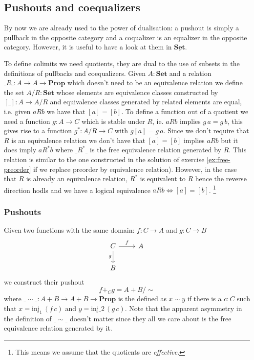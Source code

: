 \documentclass{article}
\newcommand{\Prop}{\mathbf{Prop}}
\newcommand{\Set}{\mathbf{Set}}
\newcommand{\cat}[1]{\underline{\mathbf{#1}}}
\newcommand{\inj}{\mathrm{inj}}
\begin{document}
\subsection{Pushouts and coequalizers}
\label{sec:push-coeq}

By now we are already used to the power of dualisation: a pushout is simply a pullback in the opposite category and a coqualizer is an equalizer in the opposite category. However, it is useful to have a look at them in $\cat{\Set}$.

To define colimits we need quotients, they are dual to the use of subsets in the definitions of pullbacks and coequalizers. Given $A:\Set$ and a relation $\_R\_:A \to A \to \Prop$ which doesn't need to be an equivalence relation we define the set $A/R : \Set$ whose elements are equivalence classes constructed by $[\_] : A \to A/R$ and equivalence classes generated by related elements are equal, i.e. given $a R b$ we have that $[a] = [b]$. To define a function out of a quotient we need a function $g : A \to C$ which is stable under $R$, ie. $a R b$ implies $g\,a = g\,b$, this gives rise to a function $g^* : A/R \to C$ with $g [a] = g\, a$. Since we don't require that $R$ is an equivalence relation we don't have that $[a] = [b]$ implies $a R b$ but it does imply $a R^* b$ where $\_R^*\_$ is the free equivalence relation generated by $R$. This relation is similar to the one constructed in the solution of exercise \ref{ex:free-preorder} if we replace preorder by equivalence relation). However, in the case that $R$ is already an equivalence relation, $R^*$ is equivalent to $R$ hence the reverse direction hodls and we have a logical equivalence $ a R b \iff [ a ] = [ b ]$.
\footnote{This means we assume that the quotients are \emph{effective}.}

\subsubsection{Pushouts}
\label{sec:pushouts}

Given two functions with the same domain: $f : C \to A$ and $g : C \to B$ 
\[\begin{tikzcd}
C \arrow[r,"f"]\arrow[d,"g" left] & A \\
B  
\end{tikzcd}\]
we construct their pushout 
\[ f +_C g = A+B / \sim \]
where $\_\sim\_ : A+B \to A+B \to \Prop$ is the defined as $x \sim y$ if there is a $c:C$ such that $x = \inj_1\,(f\,c)$ and $y = \inj\_2\,(g\,c)$. Note that the apparent asymmetry in the definition of $\_\sim\_$ doesn't matter since they all we care about is the free equivalence relation generated by it.
\end{document}

